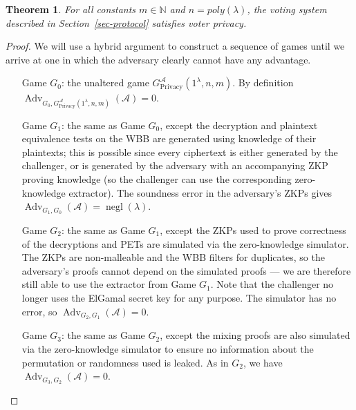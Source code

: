 \documentclass[12pt,a4paper]{article}
\DeclareMathOperator{\negl}{\text{negl}}
\DeclareMathOperator{\Adv}{\text{Adv}}
\newtheorem{theorem}{Theorem}
\theoremstyle{definition}
\begin{document}
\begin{theorem}\label{thm-privacy}
    For all constants $m \in \mathbb{N}$ and $n=poly(\lambda)$, the voting system described in Section~\ref{sec-protocol} satisfies voter privacy.
\end{theorem}
\begin{proof}
    We will use a hybrid argument to construct a sequence of games until we arrive at one in which the adversary clearly cannot have any advantage.
    \begin{itemize}[leftmargin=4em]
        \item[Game] $G_0$: the unaltered game $G^\mathcal{A}_{\text{Privacy}}(1^\lambda, n, m)$. By definition $\Adv_{G_0, G^\mathcal{A}_{\text{Privacy}}(1^\lambda, n, m)}(\mathcal{A})=0$.
        
        \item[Game] $G_1$: the same as Game $G_0$, except the decryption and plaintext equivalence tests on the WBB are generated using knowledge of their plaintexts; this is possible since every ciphertext is either generated by the challenger, or is generated by the adversary with an accompanying ZKP proving knowledge (so the challenger can use the corresponding zero-knowledge extractor). The soundness error in the adversary's ZKPs gives $\Adv_{G_1, G_0}(\mathcal{A})=\negl(\lambda)$.
 
        \item[Game] $G_2$: the same as Game $G_1$, except the ZKPs used to prove correctness of the decryptions and PETs are simulated via the zero-knowledge simulator. The ZKPs are non-malleable and the WBB filters for duplicates, so the adversary's proofs cannot depend on the simulated proofs --- we are therefore still able to use the extractor from Game $G_1$. Note that the challenger no longer uses the ElGamal secret key for any purpose. The simulator has no error, so $\Adv_{G_2, G_1}(\mathcal{A})=0$.
 
        \item[Game] $G_3$: the same as Game $G_2$, except the mixing proofs are also simulated via the zero-knowledge simulator to ensure no information about the permutation or randomness used is leaked. As in $G_2$, we have $\Adv_{G_3, G_2}(\mathcal{A})=0$.
        

\end{itemize}
\end{proof}
\end{document}
